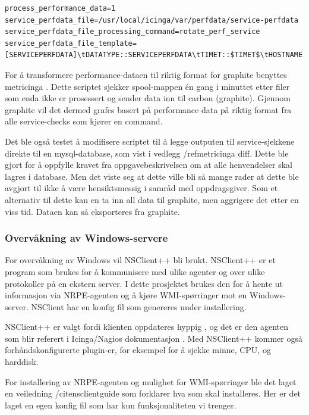 \begin{lstlisting}
process_performance_data=1
service_perfdata_file=/usr/local/icinga/var/perfdata/service-perfdata
service_perfdata_file_processing_command=rotate_perf_service
service_perfdata_file_template=[SERVICEPERFDATA]\tDATATYPE::SERVICEPERFDATA\tTIMET::$TIMET$\tHOSTNAME::$HOSTNAME$\tSERVICEDESC::$SERVICEDESC$\tSERVICEPERFDATA::$SERVICEPERFDATA$service_perfdata_file_processing_interval=200
\end{lstlisting}

For å transformere performance-dataen til riktig format for graphite benyttes metricinga \cite{metricinga}. Dette scriptet sjekker spool-mappen én gang i minuttet etter filer som enda ikke er prosessert og sender data inn til carbon (graphite). 
Gjennom graphite vil det dermed grafes basert på performance data på riktig format fra alle service-checks som kjører en command.

Det ble også testet å modifisere scriptet til å legge outputen til service-sjekkene direkte til en mysql-database, som vist i vedlegg /ref{metricinga diff}. Dette ble gjort for å oppfylle kravet fra oppgavebeskrivelsen om at alle henvendelser skal lagres i database. Men det viste seg at dette ville bli så mange rader at dette ble avgjort til ikke å være hensiktsmessig i samråd med oppdragsgiver. Som et alternativ til dette kan en ta inn all data til graphite, men aggrigere det etter en viss tid. Dataen kan så eksporteres fra graphite.

\subsubsection{Overvåkning av Windows-servere}
For overvåkning av Windows vil NSClient++ bli brukt. NSClient++ er et program som brukes for  å kommunisere med ulike agenter og over ulike protokoller på en ekstern server. I dette prosjektet brukes den for å hente ut informasjon via NRPE-agenten og å kjøre WMI-spørringer mot en Windows-server. NSClient har en konfig fil som genereres under installering. 

NSClient++ er valgt fordi klienten oppdateres hyppig \cite{nsclient}, og det er den agenten som blir referert i Icinga/Nagios dokumentasjon \cite{icingawin}. Med NSClient++ kommer også forhåndskonfigurerte plugin-er, for eksempel for å sjekke minne, CPU, og harddisk.

For installering av NRPE-agenten og mulighet for WMI-spørringer ble det laget en veiledning /cite{nsclientguide} som forklarer hva som skal installeres. Her er det laget en egen konfig fil som har kun funksjonaliteten vi trenger. 


